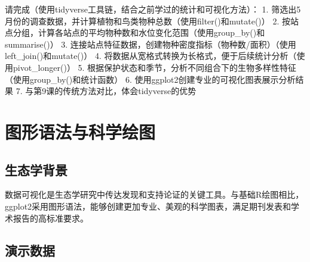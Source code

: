 \documentclass[
]{book}
\begin{document}
请完成（使用tidyverse工具链，结合之前学过的统计和可视化方法）：
1. 筛选出5月份的调查数据，并计算植物和鸟类物种总数（使用filter()和mutate()）
2. 按站点分组，计算各站点的平均物种数和水位变化范围（使用group\_by()和summarise()）
3. 连接站点特征数据，创建物种密度指标（物种数/面积）（使用left\_join()和mutate()）
4. 将数据从宽格式转换为长格式，便于后续统计分析（使用pivot\_longer()）
5. 根据保护状态和季节，分析不同组合下的生物多样性特征（使用group\_by()和统计函数）
6. 使用ggplot2创建专业的可视化图表展示分析结果
7. 与第9课的传统方法对比，体会tidyverse的优势

\hypertarget{ux56feux5f62ux8bedux6cd5ux4e0eux79d1ux5b66ux7ed8ux56fe}{%
\section{图形语法与科学绘图}\label{ux56feux5f62ux8bedux6cd5ux4e0eux79d1ux5b66ux7ed8ux56fe}}

\hypertarget{ux751fux6001ux5b66ux80ccux666f-9}{%
\subsection{生态学背景}\label{ux751fux6001ux5b66ux80ccux666f-9}}

数据可视化是生态学研究中传达发现和支持论证的关键工具。与基础R绘图相比，ggplot2采用图形语法，能够创建更加专业、美观的科学图表，满足期刊发表和学术报告的高标准要求。

\hypertarget{ux6f14ux793aux6570ux636e-8}{%
\subsection{演示数据}\label{ux6f14ux793aux6570ux636e-8}}
\end{document}

